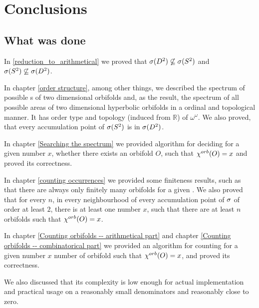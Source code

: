 \chapter{Conclusions}

\section{What was done}
In \ref{reduction_to_arithmetical} we proved that ${{\sigma}(D^2)} \not\subseteq {{\sigma}(S^2)}$ and 
${{\sigma}(S^2)} \not\subseteq {{\sigma}(D^2)}$. 

In chapter \ref{order structure}, among other things, we described the spectrum of possible \Eoc s 
of two dimensional orbifolds
and, as the result, the spectrum of all possible areas 
of two dimensional hyperbolic orbifolds in a ordinal and topological manner. 
It has order type and topology (induced from $\mathbb{R}$) of $\omega^\omega$. 
We also proved, that every accumulation point of ${{\sigma}(S^2)}$ is in ${{\sigma}(D^2)}$.

In chapter \ref{Searching the spectrum} 
we provided algorithm for deciding for a given number $x$, whether 
there exists an orbifold $O$, such that ${\chi^{orb}(O)} = x$ and proved its correctness.

In chapter \ref{counting occurrences} we provided some finiteness results, such as that 
there are always only finitely many 
orbifolds for a given \Eoc. 
We also proved that for every $n$, in every neighbourhood of every accumulation point 
of ${\sigma}$ of order at least $2$, there is at least one number $x$, such that there are at least 
$n$ orbifolds such that ${\chi^{orb}(O)} = x$.

In chapter \ref{Counting orbifolds -- arithmetical part} 
and chapter \ref{Counting orbifolds -- combinatorical part} 
we provided an algorithm 
 for counting for a given number $x$ number of orbifold such that ${\chi^{orb}(O)} = x$,
and proved its correctness. 
 
We also discussed that its complexity is low enough for actual implementation 
and practical usage on a reasonably small denominators and reasonably close to zero.




